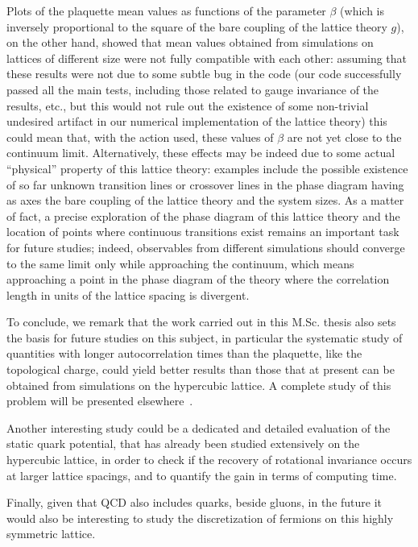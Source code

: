 Plots of the plaquette mean values as functions of the parameter $\beta$ (which is inversely proportional to the square of the bare coupling of the lattice theory $g$), on the other hand, showed that mean values obtained from simulations on lattices of different size were not fully compatible with each other: assuming that these results were not due to some subtle bug in the code (our code successfully passed all the main tests, including those related to gauge invariance of the results, etc., but this would not rule out the existence of some non-trivial undesired artifact in our numerical implementation of the lattice theory) this could mean that, with the action used, these values of $\beta$ are not yet close to the continuum limit.
Alternatively, these effects may be indeed due to some actual ``physical'' property of this lattice theory: examples include the possible existence of so far unknown transition lines or crossover lines in the phase diagram having as axes the bare coupling of the lattice theory and the system sizes. As a matter of fact, a precise exploration of the phase diagram of this lattice theory and the location of points where continuous transitions exist remains an important task for future studies; indeed, observables from different simulations should converge to the same limit only while approaching the continuum, which means approaching a point in the phase diagram of the theory where the correlation length in units of the lattice spacing is divergent.

To conclude, we remark that the work carried out in this M.Sc. thesis also sets the basis for future studies on this subject, in particular the systematic study of quantities with longer autocorrelation times than the plaquette, like the topological charge, could yield better results than those that at present can be obtained from simulations on the hypercubic lattice. A complete study of this problem will be presented elsewhere~\cite{Aliberti:2024soa}.

Another interesting study could be a dedicated and detailed evaluation of the static quark potential, that has already been studied extensively on the hypercubic lattice, in order to check if the recovery of rotational invariance occurs at larger lattice spacings, and to quantify the gain in terms of computing time.

Finally, given that QCD also includes quarks, beside gluons, in the future it would also be interesting to study the discretization of fermions on this highly symmetric lattice.
